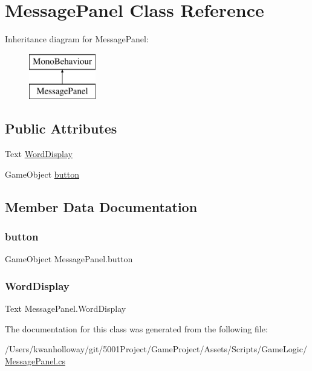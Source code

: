 \hypertarget{class_message_panel}{}\section{Message\+Panel Class Reference}
\label{class_message_panel}
Inheritance diagram for Message\+Panel\+:\begin{figure}[H]
\begin{center}
\leavevmode
\includegraphics[height=2.000000cm]{class_message_panel}
\end{center}
\end{figure}
\subsection*{Public Attributes}
\begin{DoxyCompactItemize}
\item 
Text \hyperlink{class_message_panel_a8b8f813b410d2e40ff070399c7a964cb}{Word\+Display}
\item 
Game\+Object \hyperlink{class_message_panel_a7b8a8ec70900e2bfb62c29afb388f5ac}{button}
\end{DoxyCompactItemize}


\subsection{Member Data Documentation}
\mbox{\label{class_message_panel_a7b8a8ec70900e2bfb62c29afb388f5ac}} 
\subsubsection{\texorpdfstring{button}{button}}
{\footnotesize\ttfamily Game\+Object Message\+Panel.\+button}

\mbox{\label{class_message_panel_a8b8f813b410d2e40ff070399c7a964cb}} 
\subsubsection{\texorpdfstring{Word\+Display}{WordDisplay}}
{\footnotesize\ttfamily Text Message\+Panel.\+Word\+Display}



The documentation for this class was generated from the following file\+:\begin{DoxyCompactItemize}
\item 
/\+Users/kwanholloway/git/5001\+Project/\+Game\+Project/\+Assets/\+Scripts/\+Game\+Logic/\hyperlink{_message_panel_8cs}{Message\+Panel.\+cs}\end{DoxyCompactItemize}
